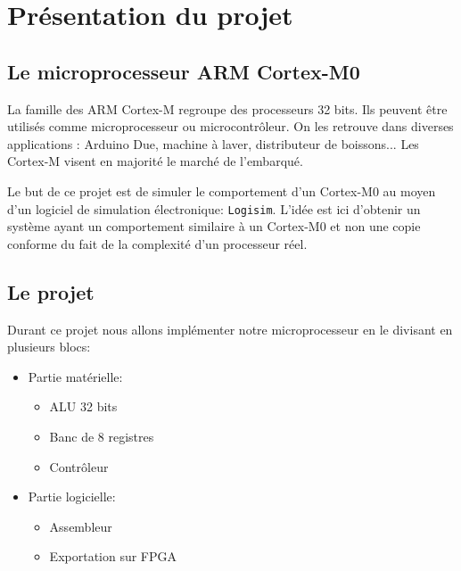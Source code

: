 \documentclass{article}
\begin{document}
    \section{Présentation du projet}

    \subsection{Le microprocesseur ARM Cortex-M0}

    La famille des ARM Cortex-M regroupe des processeurs 32 bits.
    Ils peuvent être utilisés comme microprocesseur ou microcontrôleur.
    On les retrouve dans diverses applications : Arduino Due, machine à laver, distributeur de boissons... Les Cortex-M visent en majorité le marché de l'embarqué.

    Le but de ce projet est de simuler le comportement d'un Cortex-M0 au moyen d'un logiciel de simulation électronique: \texttt{Logisim}.
    L'idée est ici d'obtenir un système ayant un comportement similaire à un Cortex-M0 et non une copie conforme du fait de la complexité d'un processeur réel.

    \subsection{Le projet}
    Durant ce projet nous allons implémenter notre microprocesseur en le divisant en plusieurs blocs:
    \begin{itemize}
        \item Partie matérielle:
        \begin{itemize}
            \item ALU 32 bits
            \item Banc de 8 registres
            \item Contrôleur
        \end{itemize}
        \item Partie logicielle:
        \begin{itemize}
            \item Assembleur
            \item Exportation sur FPGA
        \end{itemize}
    \end{itemize}
\end{document}
